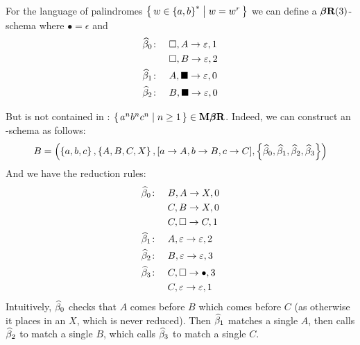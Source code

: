 \documentclass{llncs}
\begin{document}
For the language of palindromes $\set{w\in\set{a,b}^*}[w=w^r]$ we can define a $\hbox{{\bf$\boldsymbol{\beta}$R}}(3)$-schema where $\bullet=\epsilon$ and
\begin{align*}
    \widehat\beta_0\colon\quad& \square,A\to\varepsilon,1\\
        & \square,B\to\varepsilon,2\\
    \widehat\beta_1\colon\quad& A,\blacksquare\to\varepsilon,0\\
    \widehat\beta_2\colon\quad& B,\blacksquare\to\varepsilon,0\\
\end{align*}

But \MBR{} is not contained in \CFL{}: $\set{a^nb^nc^n}[n\geq1]\in\MBR$.
Indeed, we can construct an \MBR-schema as follows:
\[ B = \parens{\set{a,b,c},\set{A,B,C,X},[a\to A,b\to B,c\to C],\set{\hb_0,\hb_1,\hb_2,\hb_3}} \]
And we have the reduction rules:
\begin{align*}
    \widehat\beta_0\colon\quad& B,A\to X,0\\
        &C,B\to X,0\\
        &C,\square\to C,1\\
    \widehat\beta_1\colon\quad& A,\varepsilon\to\varepsilon,2\\
    \widehat\beta_2\colon\quad& B,\varepsilon\to\varepsilon,3\\
    \widehat\beta_3\colon\quad& C,\square\to\bullet,3\\
        &C,\varepsilon\to\varepsilon,1
\end{align*}
Intuitively, $\widehat\beta_0$ checks that $A$ comes before $B$ which comes before $C$ (as otherwise it places in an $X$, which is never reduced).
Then $\widehat\beta_1$ matches a single $A$, then calls $\widehat\beta_2$ to match a single $B$, which calls $\widehat\beta_3$ to match a single $C$.



\end{document}
